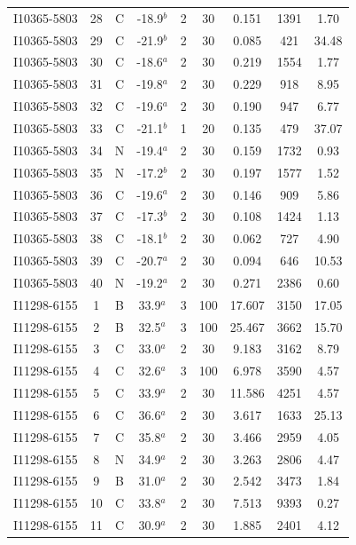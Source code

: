 \begin{table}
\begin{tabular}{ccccccccc}
I10365-5803 & 28 & C & -18.9$^{b}$ & 2 & 30 & 0.151 & 1391 & 1.70 \\
I10365-5803 & 29 & C & -21.9$^{b}$ & 2 & 30 & 0.085 & 421 & 34.48 \\
I10365-5803 & 30 & C & -18.6$^{a}$ & 2 & 30 & 0.219 & 1554 & 1.77 \\
I10365-5803 & 31 & C & -19.8$^{a}$ & 2 & 30 & 0.229 & 918 & 8.95 \\
I10365-5803 & 32 & C & -19.6$^{a}$ & 2 & 30 & 0.190 & 947 & 6.77 \\
I10365-5803 & 33 & C & -21.1$^{b}$ & 1 & 20 & 0.135 & 479 & 37.07 \\
I10365-5803 & 34 & N & -19.4$^{a}$ & 2 & 30 & 0.159 & 1732 & 0.93 \\
I10365-5803 & 35 & N & -17.2$^{b}$ & 2 & 30 & 0.197 & 1577 & 1.52 \\
I10365-5803 & 36 & C & -19.6$^{a}$ & 2 & 30 & 0.146 & 909 & 5.86 \\
I10365-5803 & 37 & C & -17.3$^{b}$ & 2 & 30 & 0.108 & 1424 & 1.13 \\
I10365-5803 & 38 & C & -18.1$^{b}$ & 2 & 30 & 0.062 & 727 & 4.90 \\
I10365-5803 & 39 & C & -20.7$^{a}$ & 2 & 30 & 0.094 & 646 & 10.53 \\
I10365-5803 & 40 & N & -19.2$^{a}$ & 2 & 30 & 0.271 & 2386 & 0.60 \\
I11298-6155 & 1 & B & 33.9$^{a}$ & 3 & 100 & 17.607 & 3150 & 17.05 \\
I11298-6155 & 2 & B & 32.5$^{a}$ & 3 & 100 & 25.467 & 3662 & 15.70 \\
I11298-6155 & 3 & C & 33.0$^{a}$ & 2 & 30 & 9.183 & 3162 & 8.79 \\
I11298-6155 & 4 & C & 32.6$^{a}$ & 3 & 100 & 6.978 & 3590 & 4.57 \\
I11298-6155 & 5 & C & 33.9$^{a}$ & 2 & 30 & 11.586 & 4251 & 4.57 \\
I11298-6155 & 6 & C & 36.6$^{a}$ & 2 & 30 & 3.617 & 1633 & 25.13 \\
I11298-6155 & 7 & C & 35.8$^{a}$ & 2 & 30 & 3.466 & 2959 & 4.05 \\
I11298-6155 & 8 & N & 34.9$^{a}$ & 2 & 30 & 3.263 & 2806 & 4.47 \\
I11298-6155 & 9 & B & 31.0$^{a}$ & 2 & 30 & 2.542 & 3473 & 1.84 \\
I11298-6155 & 10 & C & 33.8$^{a}$ & 2 & 30 & 7.513 & 9393 & 0.27 \\
I11298-6155 & 11 & C & 30.9$^{a}$ & 2 & 30 & 1.885 & 2401 & 4.12 \\

\end{tabular}
\end{table}
